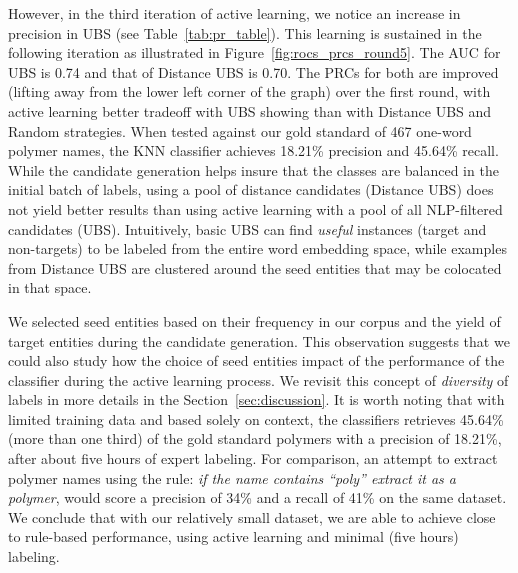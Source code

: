 However, in the third iteration of active learning, we notice an increase in precision in UBS (see Table~\ref{tab:pr_table}). 
This learning is sustained in the following iteration as illustrated in Figure~\ref{fig:rocs_prcs_round5}. 
The AUC for UBS is 0.74 and that of Distance UBS is 0.70. 
The PRCs for both are improved (lifting away from the lower left corner of the graph) over the first round, 
with active learning better tradeoff with UBS showing than with Distance UBS and Random strategies.
When tested against our gold standard of 467 one-word polymer names, the KNN classifier achieves 18.21\% precision and  45.64\% recall. 
While the candidate generation helps insure that the classes are balanced in the initial batch of labels, using a pool of distance candidates (Distance UBS) does not yield better results than using active learning with a pool of all NLP-filtered candidates (UBS).
Intuitively, basic UBS can find \textit{useful} instances (target and non-targets) to be labeled from the entire word embedding space, while examples from Distance UBS are clustered around the seed entities that may be colocated in that space.

We selected seed entities based on their frequency in our corpus and the yield of target entities during the candidate generation.
This observation suggests that we could also study how the choice of seed entities impact of the performance of the classifier during the active learning process. 
We revisit this concept of \textit{diversity} of labels in more details in the Section~\ref{sec:discussion}. 
It is worth noting that with limited training data and based solely on context, the classifiers retrieves 45.64\% (more than one third) of the gold standard polymers with a precision of 18.21\%, after about five hours of expert labeling. 
For comparison, an attempt to extract polymer names using the rule: \textit{if the name contains ``poly'' extract it as a polymer}, would score a precision of 34\% and a recall of 41\% on the same dataset.
We conclude that with our relatively small dataset, we are able to achieve close to rule-based performance, 
using active learning and minimal (five hours) labeling.

